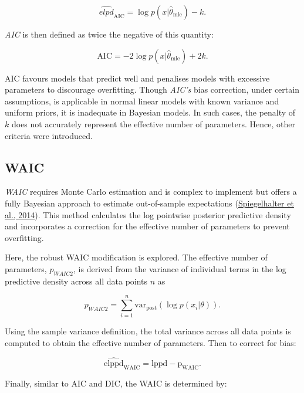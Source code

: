 \documentclass[
  11pt,
]{article}
\begin{document}
\begin{equation}
\widehat{elpd}_{\text{AIC}} = \log p(x|\hat{\theta}_{\text{mle}}) - k.
\end{equation}

\emph{AIC} is then defined as twice the negative of this quantity:

\begin{equation}
\text{AIC} = -2 \log p(x|\hat{\theta}_{\text{mle}}) + 2k.
\end{equation}

AIC favours models that predict well and penalises models with excessive
parameters to discourage overfitting. Though \emph{AIC's} bias
correction, under certain assumptions, is applicable in normal linear
models with known variance and uniform priors, it is inadequate in
Bayesian models. In such cases, the penalty of \(k\) does not accurately
represent the effective number of parameters. Hence, other criteria were
introduced.

\subsection{WAIC}

\emph{WAIC} requires Monte Carlo estimation and is complex to implement
but offers a fully Bayesian approach to estimate out-of-sample
expectations (\protect\hyperlink{ref-Spiegelhalter2014}{Spiegelhalter et
al., 2014}). This method calculates the log pointwise posterior
predictive density and incorporates a correction for the effective
number of parameters to prevent overfitting.

Here, the robust WAIC modification is explored. The effective number of
parameters, \(p_{WAIC2}\), is derived from the variance of individual
terms in the log predictive density across all data points \(n\) as

\begin{equation}
p_{WAIC2} = \sum_{i=1}^{n} \text{var}_{\text{post}}(\log p(x_i|\theta)).
\end{equation}

Using the sample variance definition, the total variance across all data
points is computed to obtain the effective number of parameters. Then to
correct for bias:

\begin{equation}
\widehat{\text{elppd}}_{\text{WAIC}} = \text{lppd} - \text{p}_{\text{WAIC}}.
\end{equation}

Finally, similar to AIC and DIC, the WAIC is determined by:
\end{document}
